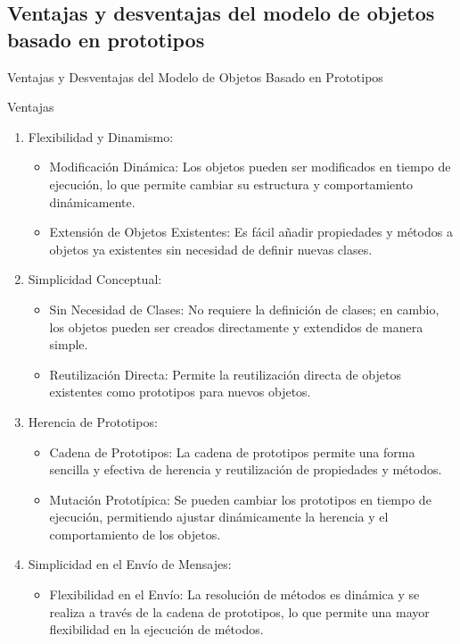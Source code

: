 \documentclass{article}
\begin{document}
\subsection*{Ventajas y desventajas del modelo de objetos basado en prototipos }

Ventajas y Desventajas del Modelo de Objetos Basado en Prototipos

Ventajas

\begin{enumerate}
    \item Flexibilidad y Dinamismo:
          \begin{itemize}
              \item Modificación Dinámica: Los objetos pueden ser modificados en tiempo de ejecución, lo que permite
                    cambiar su estructura y comportamiento dinámicamente.
              \item Extensión de Objetos Existentes: Es fácil añadir propiedades y métodos a objetos ya existentes sin
                    necesidad de definir nuevas clases.
          \end{itemize}
    \item Simplicidad Conceptual:
          \begin{itemize}
              \item Sin Necesidad de Clases: No requiere la definición de clases; en cambio, los objetos pueden ser
                    creados directamente y extendidos de manera simple.
              \item Reutilización Directa: Permite la reutilización directa de objetos existentes como prototipos
                    para nuevos objetos.
          \end{itemize}
    \item Herencia de Prototipos:
          \begin{itemize}
              \item Cadena de Prototipos: La cadena de prototipos permite una forma sencilla y efectiva de herencia y
                    reutilización de propiedades y métodos.
              \item Mutación Prototípica: Se pueden cambiar los prototipos en tiempo de ejecución, permitiendo ajustar
                    dinámicamente la herencia y el comportamiento de los objetos.
          \end{itemize}
    \item Simplicidad en el Envío de Mensajes:
          \begin{itemize}
              \item Flexibilidad en el Envío: La resolución de métodos es dinámica y se realiza a través de la cadena
                    de prototipos, lo que permite una mayor flexibilidad en la ejecución de métodos.
          \end{itemize}
\end{enumerate}
\end{document}
